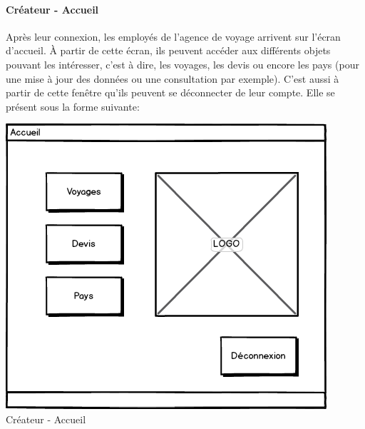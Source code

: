 \documentclass[11pt]{article}
\begin{document}
\paragraph{Créateur - Accueil}
Après leur connexion, les employés de l'agence de voyage arrivent sur l'écran d'accueil. À	partir de cette écran, ils peuvent accéder aux différents objets pouvant les intéresser, c'est à dire, les voyages, les devis ou encore les pays (pour une mise à jour des données ou une consultation par exemple). C'est aussi à partir de cette fenêtre qu'ils peuvent se déconnecter de leur compte. Elle se présent sous la forme suivante:
\begin{center}
\includegraphics[scale = 0.5]{../Conception_graphique/png_Pour_CR/Createur-10-Accueil.png}
\newline
Créateur - Accueil
\label{fig:Cr-Accueil}
\end{center}
\end{document}

